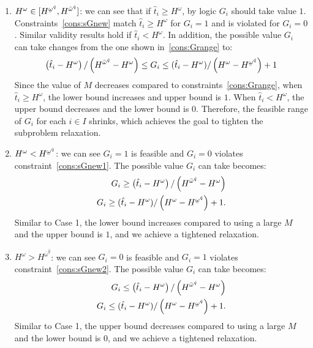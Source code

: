 \documentclass[11pt]{article}
\renewcommand{\underbar}{\underaccent{\bar}}
\begin{document}
	\begin{enumerate}
		\item 
			\(H^\omega \in [H^{\underbar{\omega}^{\hat{q}}},H^{\bar{\omega}^{\hat{q}}}]\): we can see that if \(\hat{t}_i \geq H^\omega\), by logic \(G_i\) should take value \(1\). Constraints~\eqref{cons:sGnew} match \(\hat{t}_i \geq H^\omega\) for \(G_i = 1\) and is violated for \(G_i = 0\). Similar validity results hold if \(\hat{t}_i < H^\omega\). In addition, the possible value \(G_i\) can take changes from the one shown in~\eqref{cons:Grange} to:
			\begin{equation*}
			\left(\hat{t}_i - H^\omega \right)/\left( H^{\bar{\omega}^{\hat{q}}} - H^\omega \right) \leq G_i \leq (\hat{t}_i - H^\omega)/\left(H^\omega - H^{\underbar{\omega}^{\hat{q}}} \right) + 1
			\end{equation*}
			Since the value of \(M\) decreases compared to constraints~\eqref{cons:Grange}, when \(\hat{t}_i \geq H^\omega\), the lower bound increases and upper bound is \(1\). When \(\hat{t}_i < H^\omega\), the upper bound decreases and the lower bound is \(0\). Therefore, the feasible range of \(G_i\) for each \(i \in I\) shrinks, which achieves the goal to tighten the subproblem relaxation.
		\item 
			\(H^\omega < H^{\underbar{\omega}^{\hat{q}}}\): we can see \(G_i = 1\) is feasible and \(G_i = 0\) violates constraint~\eqref{cons:sGnew1}. The possible value \(G_i\) can take becomes:
			\begin{align*}
			G_i \geq \left(\hat{t}_i - H^\omega \right)/\left( H^{\bar{\omega}^{\hat{q}}} - H^\omega \right)\\
			G_i \geq (\hat{t}_i - H^\omega)/\left(H^\omega - H^{\underbar{\omega}^{\hat{q}}} \right) + 1.
			\end{align*}
			Similar to Case 1, the lower bound increases compared to using a large \(M\) and the upper bound is \(1\), and we achieve a tightened relaxation.
		\item 
			\(H^\omega > H^{\bar{\omega}^{\hat{q}}}\): we can see \(G_i = 0\) is feasible and \(G_i = 1\) violates constraint~\eqref{cons:sGnew2}. The possible value \(G_i\) can take becomes:
			\begin{align*}
			G_i \leq \left(\hat{t}_i - H^\omega \right)/\left( H^{\bar{\omega}^{\hat{q}}} - H^\omega \right)\\
			G_i \leq (\hat{t}_i - H^\omega)/\left(H^\omega - H^{\underbar{\omega}^{\hat{q}}} \right) + 1.
			\end{align*}
			Similar to Case 1, the upper bound decreases compared to using a large \(M\) and the lower bound is \(0\), and we achieve a tightened relaxation.
	\end{enumerate}
\end{document}
